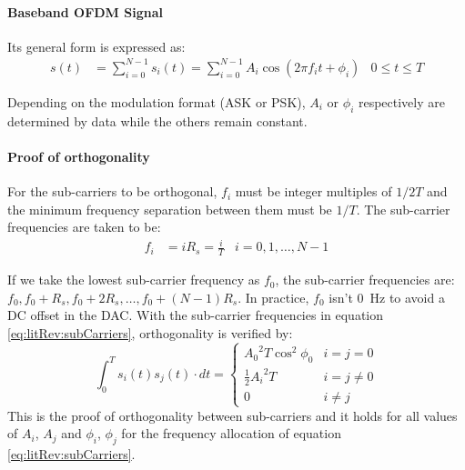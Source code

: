 \paragraph{Baseband OFDM Signal} Its general form is expressed as:
\begin{align*}
	s(t) &= \sum_{i=0}^{N-1}s_i(t) = \sum_{i=0}^{N-1}A_i \cos (2\pi f_i t + \phi_i) & 0 \leq t \leq T
\end{align*}
\begin{mathDef}
\end{mathDef}
Depending on the modulation format (\gls{ASK} or \gls{PSK}), \(A_i\) or \(\phi_i\) respectively are determined by data while the others remain constant.
\paragraph{Proof of orthogonality} For the sub-carriers to be orthogonal, \(f_i\) must be integer multiples of \(1/2T\) and the minimum frequency separation between them must be \(1/T\). The sub-carrier frequencies are taken to be:
\begin{align}
	f_i &= iR_s = \frac{i}{T} & i = 0, 1, \ldots, N-1
	\label{eq:litRev:subCarriers}
\end{align}
\begin{mathDef}
\end{mathDef}
If we take the lowest sub-carrier frequency as \(f_0\), the sub-carrier frequencies are: \(f_0, f_0 + R_s, f_0 + 2R_s, \ldots, f_0 + (N-1)R_s\). In practice, \(f_0\) isn't \SI{0}{\hertz} to avoid a DC offset in the \gls{DAC}.
With the sub-carrier frequencies in equation \eqref{eq:litRev:subCarriers}, orthogonality is verified by:
\[
	\int_0^T s_i(t)s_j(t) \cdot dt =
	\begin{cases}
		{A_0}^2 T\cos^2 \phi_0 & i = j = 0 \\
		\frac{1}{2}{A_i}^2 T & i = j \neq 0 \\
		0 & i \neq j
	\end{cases}
\]
This is the proof of orthogonality between sub-carriers and it holds for all values of \(A_i\), \(A_j\) and \(\phi_i\), \(\phi_j\) for the frequency allocation of equation \eqref{eq:litRev:subCarriers}\cite{ofdm_intro}.

